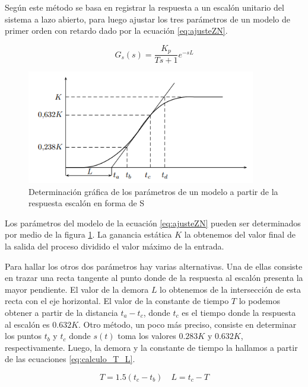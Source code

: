 \documentclass[10pt,conference,a4paper,onecolumn]{article}%
\begin{document}
Según \cite{biblia_PID} este método se basa en registrar la respuesta a un escalón
unitario del sistema a lazo abierto, para luego ajustar los tres parámetros de un modelo
de primer orden con retardo dado por la ecuación \ref{eq:ajusteZN}.

\begin{equation}
G_s(s)=\frac{K_p}{Ts+1}e^{-sL}
\label{eq:ajusteZN}
\end{equation}


\begin{figure}[h]
\centering
\includegraphics[width=10cm]{./imagenes/escalon_z-n.png}
\caption{Determinación gráfica de los parámetros de un modelo a partir de
la respuesta escalón en forma de S}
\label{fig:escalon_zn}
\end{figure}




Los parámetros del modelo de la ecuación \ref{eq:ajusteZN} pueden ser determinados por medio de la figura \ref{fig:escalon_zn}. La ganancia estática $K$ la obtenemos del valor final de la salida del proceso dividido el valor máximo de la entrada. 

Para hallar los otros dos parámetros hay varias alternativas. Una de ellas consiste en trazar una recta tangente al punto donde de la respuesta al escalón presenta la mayor pendiente. El valor de la demora $L$ lo obtenemos de la intersección de esta recta con el eje horizontal. El valor de la constante de tiempo $T$ lo podemos obtener a partir de la distancia $t_a-t_c $, donde $t_c$ es el tiempo donde la respuesta al escalón es $0.632K$.
Otro método, un poco más preciso, consiste en determinar los puntos $t_b$ y $t_c$ donde $s(t)$ toma los valores $0.283K$ y $0.632K$, respectivamente. Luego, la demora y la constante de tiempo la hallamos a partir de las ecuaciones \ref{eq:calculo_T_L}.

\begin{equation}
T=1.5(t_c -t_b) \quad	L=t_c-T
\label{eq:calculo_T_L}
\end{equation}
\end{document}
